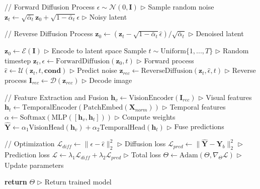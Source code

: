 \begin{algorithm}[H]
\begin{algorithmic}[1]
    \STATE // Forward Diffusion Process
    \STATE $\epsilon \sim \mathcal{N}(0, \mathbf{I})$ \hfill $\triangleright$ Sample random noise
    \STATE $\mathbf{z}_t \gets \sqrt{\bar{\alpha}_t}\mathbf{z}_0 + \sqrt{1-\bar{\alpha}_t}\epsilon$ \hfill $\triangleright$ Noisy latent
    
    \STATE // Reverse Diffusion Process
    \STATE $\mathbf{z}_0 \gets (\mathbf{z}_t - \sqrt{1-\bar{\alpha}_t}\hat{\epsilon})/\sqrt{\bar{\alpha}_t}$ \hfill $\triangleright$ Denoised latent
    
    
    
    \STATE $\mathbf{z}_0 \gets \mathcal{E}(\mathbf{I})$ \hfill $\triangleright$ Encode to latent space
    \STATE Sample $t \sim \text{Uniform}\{1,...,T\}$ \hfill $\triangleright$ Random timestep
    \STATE $\mathbf{z}_t, \epsilon \gets \text{ForwardDiffusion}(\mathbf{z}_0, t)$ \hfill $\triangleright$ Forward process
    \STATE $\hat{\epsilon} \gets \mathcal{U}(\mathbf{z}_t, t, \mathbf{cond})$ \hfill $\triangleright$ Predict noise
    \STATE $\mathbf{z}_{rec} \gets \text{ReverseDiffusion}(\mathbf{z}_t, \hat{\epsilon}, t)$ \hfill $\triangleright$ Reverse process
    \STATE $\mathbf{I}_{rec} \gets \mathcal{D}(\mathbf{z}_{rec})$ \hfill $\triangleright$ Decode image
    
    \STATE // Feature Extraction and Fusion
    \STATE $\mathbf{h}_v \gets \text{VisionEncoder}(\mathbf{I}_{rec})$ \hfill $\triangleright$ Visual features
    \STATE $\mathbf{h}_t \gets \text{TemporalEncoder}(\text{PatchEmbed}(\mathbf{X}_{norm}))$ \hfill $\triangleright$ Temporal features
    \STATE $\alpha \gets \text{Softmax}(\text{MLP}([\mathbf{h}_v, \mathbf{h}_t]))$ \hfill $\triangleright$ Compute weights
    \STATE $\hat{\mathbf{Y}} \gets \alpha_1\text{VisionHead}(\mathbf{h}_v) + \alpha_2\text{TemporalHead}(\mathbf{h}_t)$ \hfill $\triangleright$ Fuse predictions
    
    \STATE // Optimization
    \STATE $\mathcal{L}_{diff} \gets \|\epsilon - \hat{\epsilon}\|_2^2$ \hfill $\triangleright$ Diffusion loss
    \STATE $\mathcal{L}_{pred} \gets \|\hat{\mathbf{Y}} - \mathbf{Y}_b\|_2^2$ \hfill $\triangleright$ Prediction loss
    \STATE $\mathcal{L} \gets \lambda_1\mathcal{L}_{diff} + \lambda_2\mathcal{L}_{pred}$ \hfill $\triangleright$ Total loss
    \STATE $\Theta \gets \text{Adam}(\Theta, \nabla_{\Theta}\mathcal{L})$ \hfill $\triangleright$ Update parameters
\ENDWHILE

\STATE \textbf{return} $\Theta$ \hfill $\triangleright$ Return trained model
\end{algorithmic}
\end{algorithm}